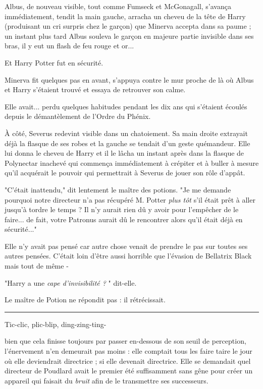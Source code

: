 Albus, de nouveau visible, tout comme Fumseck et McGonagall, s'avança immédiatement, tendit la main gauche, arracha un cheveu de la tête de Harry (produisant un cri surpris chez le garçon) que Minerva accepta dans sa paume ; un instant plus tard Albus souleva le garçon en majeure partie invisible dans ses bras, il y eut un flash de feu rouge et or...

Et Harry Potter fut en sécurité.

Minerva fit quelques pas en avant, s'appuya contre le mur proche de là où Albus et Harry s'étaient trouvé et essaya de retrouver son calme.

Elle avait... perdu quelques habitudes pendant les dix ans qui s'étaient écoulés depuis le démantèlement de l'Ordre du Phénix.

À côté, Severus redevint visible dans un chatoiement. Sa main droite extrayait déjà la flasque de ses robes et la gauche se tendait d'un geste quémandeur. Elle lui donna le cheveu de Harry et il le lâcha un instant après dans la flasque de Polynectar inachevé qui commença immédiatement à crépiter et à buller à mesure qu'il acquérait le pouvoir qui permettrait à Severus de jouer son rôle d'appât.

"C'était inattendu," dit lentement le maître des potions. "Je me demande pourquoi notre directeur n'a pas récupéré M. Potter \emph{plus tôt}  s'il était prêt à aller jusqu'à tordre le temps ? Il n'y aurait rien dû y avoir pour l'empêcher de le faire... de fait, votre Patronus aurait dû le rencontrer alors qu'il était déjà en sécurité..."

Elle n'y avait pas pensé car autre chose venait de prendre le pas sur toutes ses autres pensées. C'était loin d'être aussi horrible que l'évasion de Bellatrix Black mais tout de même -

"Harry a une \emph{cape d'invisibilité ?} " dit-elle.

Le maître de Potion ne répondit pas : il rétrécissait.
\par\noindent\rule{\textwidth}{0.4pt}
Tic-clic, plic-blip, ding-zing-ting-

bien que cela finisse toujours par passer en-dessous de son seuil de perception, l'énervement n'en demeurait pas moins : elle comptait tous les faire taire le jour où elle deviendrait directrice ; si elle devenait directrice. Elle se demandait quel directeur de Poudlard avait le premier été suffisamment sans gêne pour créer un appareil qui faisait du \emph{bruit}  afin de le transmettre ses successeurs.

